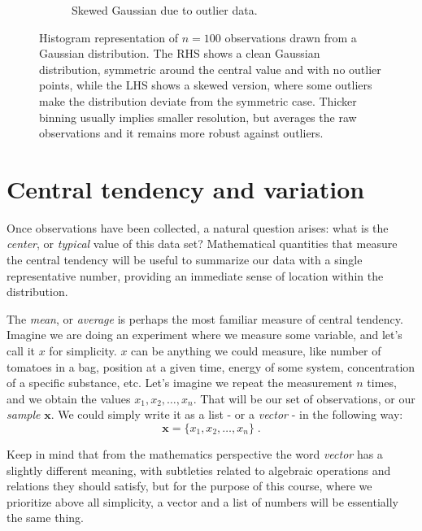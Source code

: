 \documentclass{book}
\begin{document}
\begin{figure}[ht]
\begin{subfigure}[b]{0.48\textwidth}
        \caption{Skewed Gaussian due to outlier data.}
        \label{fig:histogram2_bins_large}
    \end{subfigure}
    \caption{Histogram representation of $n = 100$ observations drawn from a Gaussian distribution. The RHS shows a clean Gaussian distribution, symmetric around the central value and with no outlier points, while the LHS shows a skewed version, where some outliers make the distribution deviate from the symmetric case. Thicker binning usually implies smaller resolution, but averages the raw observations and it remains more robust against outliers.}
        \label{fig:histogram_comparison3}
\end{figure}

\section{Central tendency and variation}

Once observations have been collected, a natural question arises: what is the \textit{center}, or \textit{typical} value of this data set? Mathematical quantities that measure the central tendency will be useful to summarize our data with a single representative number, providing an immediate sense of location within the distribution.

\medskip

The \textit{mean}, or \textit{average} is perhaps the most familiar measure of central tendency. Imagine we are doing an experiment where we measure some variable, and let's call it $x$ for simplicity. $x$ can be anything we could measure, like number of tomatoes in a bag, position at a given time, energy of some system, concentration of a specific substance, etc. Let's imagine we repeat the measurement $n$ times, and we obtain the values $x_1, x_2, \dots, x_n$. That will be our set of observations, or our \textit{sample} $\textbf{x}$. We could simply write it as a list - or a \textit{vector} - in the following way:
\begin{equation}
	\textbf{x} = \{x_1, x_2, \dots, x_n\} \; . \nonumber  
\end{equation}

Keep in mind that from the mathematics perspective the word \textit{vector} has a slightly different meaning, with subtleties related to algebraic operations and relations they should satisfy, but for the purpose of this course, where we prioritize above all simplicity, a vector and a list of numbers will be essentially the same thing.
\end{document}
